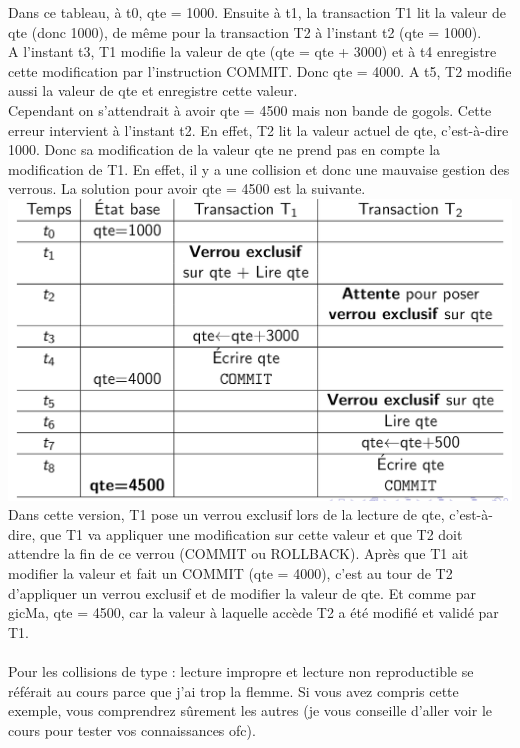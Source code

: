 \documentclass{report}
\begin{document}
Dans ce tableau, à t0, qte = 1000. Ensuite à t1, la transaction T1 lit la valeur de qte (donc 1000), de même pour la transaction T2 à l'instant t2 (qte = 1000).\\
A l'instant t3, T1 modifie la valeur de qte (qte = qte + 3000) et à t4 enregistre cette modification par l'instruction COMMIT. Donc qte = 4000. A t5, T2 modifie aussi la valeur de qte et enregistre cette valeur.\\
Cependant on s'attendrait à avoir qte = 4500 mais non bande de gogols. Cette erreur intervient à l'instant t2. En effet, T2 lit la valeur actuel de qte, c'est-à-dire 1000. Donc sa modification de la valeur qte ne prend pas en compte la modification de T1. En effet, il y a une collision et donc une mauvaise gestion des verrous. La solution pour avoir qte = 4500 est la suivante.\\
\includegraphics[scale=0.35]{./Pictures/BD3.PNG}\\ 
Dans cette version, T1 pose un verrou exclusif lors de la lecture de qte, c'est-à-dire, que T1 va appliquer une modification sur cette valeur et que T2 doit attendre la fin de ce verrou (COMMIT ou ROLLBACK). Après que T1 ait modifier la valeur et fait un COMMIT (qte = 4000), c'est au tour de T2 d'appliquer un verrou exclusif et de modifier la valeur de qte. Et comme par gicMa, qte = 4500, car la valeur à laquelle accède T2 a été modifié et validé par T1.\\\\
Pour les collisions de type : lecture impropre et lecture non reproductible se référait au cours parce que j'ai trop la flemme. Si vous avez compris cette exemple, vous comprendrez sûrement les autres (je vous conseille d'aller voir le cours pour tester vos connaissances ofc).\\\\
\end{document}
